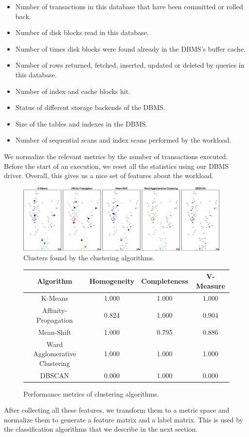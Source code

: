   \begin{itemize}    
    \item {Number of transactions in this database that have been committed or
    rolled back.}
    \item {Number of disk blocks read in this database.}
    \item {Number of times disk blocks were found already in the DBMS's buffer
    cache.}
    \item {Number of rows returned, fetched, inserted, updated or deleted by
    queries in this database.}
    \item {Number of index and cache blocks hit.}
    \item {Status of different storage backends of the DBMS.}
    \item {Size of the tables and indexes in the DBMS.}
    \item {Number of sequential scans and index scans performed by the
    workload.}
  \end{itemize}
  
  	We normalize the relevant metrics by the number of transactions executed.
  	Before the start of an execution, we reset all the statistics using our
  	DBMS driver. Overall, this gives us a nice set of features about the
  	workload. 

\begin{figure}
    \centering
    \includegraphics[width=0.95\textwidth]{figure/clustering.eps}
    \caption{Clusters found by the clustering algorithms.}
    \label{fig:clusters}
\end{figure}

\begin{figure}[h]
    \centering
    \begin{tabular}{c c c c}
      \toprule
      Algorithm                     & Homogeneity & Completeness & V-Measure \\
      \midrule
      K-Means                       & 1.000       & 1.000        & 1.000     \\
      Affinity-Propagation          & 0.824       & 1.000        & 0.904     \\
      Mean-Shift                    & 1.000       & 0.795        & 0.886     \\
      Ward Agglomerative Clustering & 1.000       & 1.000        & 1.000     \\
      DBSCAN                        & 0.000       & 1.000        & 0.000     \\
      \bottomrule
    \end{tabular}

    \caption{Performance metrics of clustering algorithms.}
    \label{fig:clustering-metrics}
\end{figure}

After collecting all these features, we transform them to a metric space and
normalize them to generate a feature matrix and a label matrix. This is 
used by the classification algorithms that we describe in the next section.
